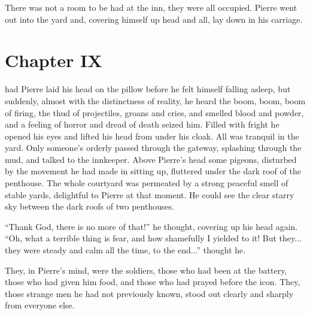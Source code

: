 There was not a room to be had at the inn, they were all
occupied.  Pierre went out into the yard and, covering himself up
head and all, lay down in his carriage.


\chapter*{Chapter IX} \ifaudio {}
\fi

 had Pierre laid his head on the pillow before he felt
himself falling asleep, but suddenly, almost with the
distinctness of reality, he heard the boom, boom, boom of firing,
the thud of projectiles, groans and cries, and smelled blood and
powder, and a feeling of horror and dread of death seized
him. Filled with fright he opened his eyes and lifted his head
from under his cloak. All was tranquil in the yard. Only
someone's orderly passed through the gateway, splashing through
the mud, and talked to the innkeeper. Above Pierre's head some
pigeons, disturbed by the movement he had made in sitting up,
fluttered under the dark roof of the penthouse. The whole
courtyard was permeated by a strong peaceful smell of stable
yards, delightful to Pierre at that moment. He could see the
clear starry sky between the dark roofs of two penthouses.

``Thank God, there is no more of that!'' he thought, covering up
his head again. ``Oh, what a terrible thing is fear, and how
shamefully I yielded to it! But they... they were steady and calm
all the time, to the end...'' thought he.

They, in Pierre's mind, were the soldiers, those who had been at
the battery, those who had given him food, and those who had
prayed before the icon. They, those strange men he had not
previously known, stood out clearly and sharply from everyone
else.

